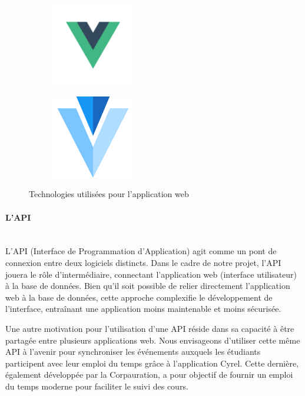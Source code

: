 \begin{figure}[h]
	\centering
	\begin{subfigure}{.45\textwidth}
		\centering
		\includegraphics[width=0.40\textwidth]{assets/vue.png}
		\label{fig:vue}
	\end{subfigure}
	\begin{subfigure}{.45\textwidth}
		\centering
		\includegraphics[width=0.40\textwidth]{assets/vuetify.png}
		\label{fig:vuetify}
	\end{subfigure}
	\caption{Technologies utilisées pour l'application web}
\end{figure}

\paragraph{L'API}
~~\\

L'API (Interface de Programmation d'Application) agit comme un pont de connexion entre deux logiciels distincts. Dans le cadre de notre projet, l'API jouera le rôle d'intermédiaire, connectant l'application web (interface utilisateur) à la base de données. Bien qu'il soit possible de relier directement l'application web à la base de données, cette approche complexifie le développement de l'interface, entraînant une application moins maintenable et moins sécurisée.

Une autre motivation pour l'utilisation d'une API réside dans sa capacité à être partagée entre plusieurs applications web. Nous envisageons d'utiliser cette même API à l'avenir pour synchroniser les événements auxquels les étudiants participent avec leur emploi du temps grâce à l'application Cyrel. Cette dernière, également développée par la Corpauration, a pour objectif de fournir un emploi du temps moderne pour faciliter le suivi des cours.

